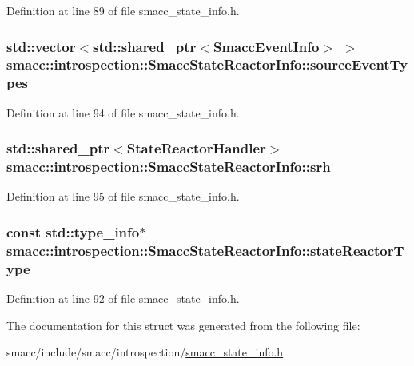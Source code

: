 Definition at line 89 of file smacc\+\_\+state\+\_\+info.\+h.

\subsubsection[{\texorpdfstring{source\+Event\+Types}{sourceEventTypes}}]{\setlength{\rightskip}{0pt plus 5cm}std\+::vector$<$std\+::shared\+\_\+ptr$<${\bf Smacc\+Event\+Info}$>$ $>$ smacc\+::introspection\+::\+Smacc\+State\+Reactor\+Info\+::source\+Event\+Types}\hypertarget{structsmacc_1_1introspection_1_1SmaccStateReactorInfo_a66cb20b15e0ad0fbfd5ad20b83462eb6}{}\label{structsmacc_1_1introspection_1_1SmaccStateReactorInfo_a66cb20b15e0ad0fbfd5ad20b83462eb6}


Definition at line 94 of file smacc\+\_\+state\+\_\+info.\+h.

\subsubsection[{\texorpdfstring{srh}{srh}}]{\setlength{\rightskip}{0pt plus 5cm}std\+::shared\+\_\+ptr$<${\bf State\+Reactor\+Handler}$>$ smacc\+::introspection\+::\+Smacc\+State\+Reactor\+Info\+::srh}\hypertarget{structsmacc_1_1introspection_1_1SmaccStateReactorInfo_a0d28653e507c3f4498475987d5916f76}{}\label{structsmacc_1_1introspection_1_1SmaccStateReactorInfo_a0d28653e507c3f4498475987d5916f76}


Definition at line 95 of file smacc\+\_\+state\+\_\+info.\+h.

\subsubsection[{\texorpdfstring{state\+Reactor\+Type}{stateReactorType}}]{\setlength{\rightskip}{0pt plus 5cm}const std\+::type\+\_\+info$\ast$ smacc\+::introspection\+::\+Smacc\+State\+Reactor\+Info\+::state\+Reactor\+Type}\hypertarget{structsmacc_1_1introspection_1_1SmaccStateReactorInfo_a02de210fcdffd81424537d4d8a330609}{}\label{structsmacc_1_1introspection_1_1SmaccStateReactorInfo_a02de210fcdffd81424537d4d8a330609}


Definition at line 92 of file smacc\+\_\+state\+\_\+info.\+h.



The documentation for this struct was generated from the following file\+:\begin{DoxyCompactItemize}
\item 
smacc/include/smacc/introspection/\hyperlink{smacc__state__info_8h}{smacc\+\_\+state\+\_\+info.\+h}\end{DoxyCompactItemize}
